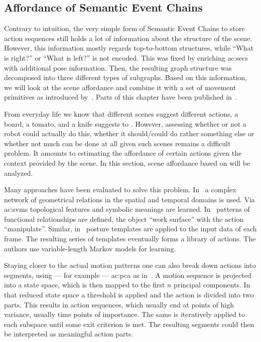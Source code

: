 \subsection{Affordance of Semantic Event Chains}
\label{ssec:action_methods_affordanceofsemanticeventchains}

Contrary to intuition, the very simple form of Semantic Event Chains to store action sequences still holds a lot of information about the structure of the scene.
However, this information mostly regards top-to-bottom structures, while ``What is right?'' or ``What is left?'' is not encoded.
This was fixed by enriching \glspl{ac:sec} with additional pose information.
Then, the resulting graph structure was decomposed into three different types of subgraphs.
Based on this information, we will look at the scene affordance and combine it with a set of movement primitives as introduced by~\cite{aeinaksoytamosiunaite2013}.
Parts of this chapter have been published in~\textcite{reichaeinwoergoetter2018}.


From everyday life we know that different scenes suggest different actions, \eg a board, a tomato, and a knife suggests to . 
However, assessing whether or not a robot could actually do this, whether it should/could do rather something else or whether not much can be done at all given such scenes remains a difficult problem. 
It amounts to estimating the affordance of certain actions given the context provided by the scene. 
In this section, scene affordance based on  will be analyzed.


Many approaches have been evaluated to solve this problem.
In~\cite{rosmanramamoorthy2011} a complex network of geometrical relations in the spatial and temporal domains is used. 
Via \glspl{ac:svm} topological features and symbolic meanings are learned. 
In~\cite{sjoojensfelt2011} patterns of functional relationships are defined, \eg the object ``work surface'' with the action ``manipulate''.
Similar, in~\cite{liangshihlialin} posture templates are applied to the input data of each frame. 
The resulting series of templates eventually forms a library of actions. 
The authors use variable-length Markov models for learning.


Staying closer to the actual motion patterns one can also break down actions into segments, using --- for example --- \gls{ac:pca} as in~\cite{yamaneyamaguchinakamura2011}. 
A motion sequence is projected into a state space, which is then mapped to the first $n$ principal components. 
In that reduced state space a threshold is applied and the action is divided into two parts. 
This results in action sequences, which usually end at points of high variance, usually time points of importance.
The same is iteratively applied to each subspace until some exit criterion is met. 
The resulting segments could then be interpreted as meaningful action parts.


